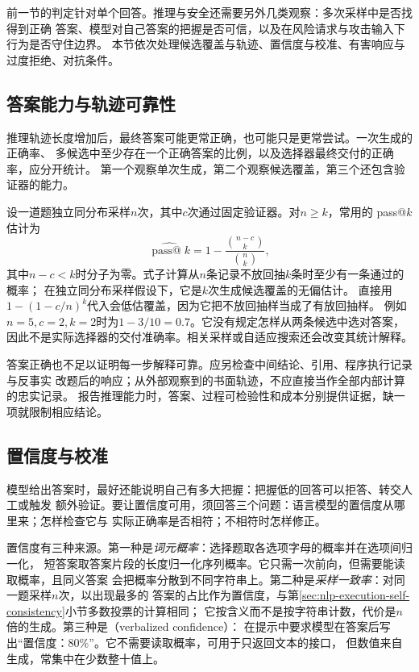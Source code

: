 前一节的判定针对单个回答。推理与安全还需要另外几类观察：多次采样中是否找得到正确
答案、模型对自己答案的把握是否可信，以及在风险请求与攻击输入下行为是否守住边界。
本节依次处理候选覆盖与轨迹、置信度与校准、有害响应与过度拒绝、对抗条件。

\subsection{答案能力与轨迹可靠性}
\label{sec:nlp-eval-reasoning}

推理轨迹长度增加后，最终答案可能更常正确，也可能只是更常尝试。一次生成的正确率、
多候选中至少存在一个正确答案的比例，以及选择器最终交付的正确率，应分开统计。
第一个观察单次生成，第二个观察候选覆盖，第三个还包含验证器的能力。

设一道题独立同分布采样$n$次，其中$c$次通过固定验证器。对$n\geq k$，常用的
pass@$k$估计为
\begin{equation}
 \widehat{\operatorname{pass@}k}
 =1-\frac{\binom{n-c}{k}}{\binom nk},
 \label{eq:nlp-eval-passk}
\end{equation}
其中$n-c<k$时分子为零。式子计算从$n$条记录不放回抽$k$条时至少有一条通过的概率；
在独立同分布采样假设下，它是$k$次生成候选覆盖的无偏估计。
直接用$1-(1-c/n)^k$代入会低估覆盖，因为它把不放回抽样当成了有放回抽样。
例如$n=5,c=2,k=2$时为$1-3/10=0.7$。它没有规定怎样从两条候选中选对答案，
因此不是实际选择器的交付准确率。相关采样或自适应搜索还会改变其统计解释。

答案正确也不足以证明每一步解释可靠。应另检查中间结论、引用、程序执行记录与反事实
改题后的响应；从外部观察到的书面轨迹，不应直接当作全部内部计算的忠实记录。
报告推理能力时，答案、过程可检验性和成本分别提供证据，缺一项就限制相应结论。

\subsection{置信度与校准}
\label{sec:nlp-eval-calibration}

模型给出答案时，最好还能说明自己有多大把握：把握低的回答可以拒答、转交人工或触发
额外验证。要让置信度可用，须回答三个问题：语言模型的置信度从哪里来；怎样检查它与
实际正确率是否相符；不相符时怎样修正。

置信度有三种来源。第一种是\emph{词元概率}：选择题取各选项字母的概率并在选项间归一化，
短答案取答案片段的长度归一化序列概率。它只需一次前向，但需要能读取概率，且同义答案
会把概率分散到不同字符串上。第二种是\emph{采样一致率}：对同一题采样$n$次，以出现最多的
答案的占比作为置信度，与第\ref{sec:nlp-execution-self-consistency}小节多数投票的计算相同；
它按含义而不是按字符串计数，代价是$n$倍的生成。第三种是（verbalized confidence）：
在提示中要求模型在答案后写出“置信度：80\%”。它不需要读取概率，可用于只返回文本的接口，
但数值来自生成，常集中在少数整十值上。

